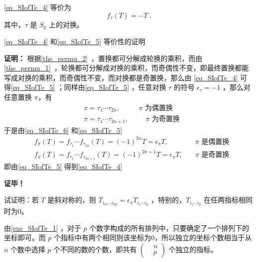 \autoref{eq_SIofTe_4} 等价为
\begin{equation}\label{eq_SIofTe_5}
f_\tau(T)=-T~.
\end{equation}
其中，$\tau$ 是 $S_p$ 上的对换。
\begin{example}{}
\autoref{eq_SIofTe_4} 和\autoref{eq_SIofTe_5} 等价性的证明

\textbf{证明：}
根据\autoref{the_permu_2}~，置换都可分解成轮换的乘积，而由\autoref{the_permu_1}~，轮换都可分解成对换的乘积，而奇偶性不变，即最终置换都能写成对换的乘积，而奇偶性不变，而对换都是奇置换，那么由 \autoref{eq_SIofTe_4} 可得\autoref{eq_SIofTe_5} ；同样由\autoref{eq_SIofTe_5} ，任意对换 $\tau$ 的符号 $\epsilon_\tau=-1$ ，那么对任意置换 $\pi$，有
\begin{equation}
\begin{aligned}
&\pi=\tau_1\cdots\tau_{2n}, \quad &\text{ $\pi$ 为偶置换}\\
&\pi=\tau_1\cdots\tau_{2n+1}, &\quad \text{ $\pi$ 为奇置换}
\end{aligned}
\end{equation}
于是由\autoref{eq_SIofTe_6} 和\autoref{eq_SIofTe_5} 
\begin{equation}
\begin{aligned}
&f_\pi(T)=f_{\tau_1}\cdots f_{\tau_{2n}}(T)=(-1)^{2n}T=\epsilon_\pi T,\quad&\text{$\pi$ 是偶置换}\\
&f_\pi(T)=f_{\tau_1}\cdots f_{\tau_{2n+1}}(T)=(-1)^{2n+1}T=\epsilon_\pi T,\quad&\text{$\pi$ 是奇置换}
\end{aligned}
\end{equation}
即由\autoref{eq_SIofTe_5} 得到\autoref{eq_SIofTe_4} 

\textbf{证毕！}

\end{example}






\begin{exercise}{}\label{exe_SIofTe_1}
试证明：若 $T$ 是斜对称的，则 $T_{i_{\pi1}\cdots i_{\pi p}}=\epsilon_\pi T_{i_1\cdots i_p}$ ，特别的，$ T_{i_1\cdots i_p}$ 在任两指标相同时为0。
\end{exercise}

由\autoref{exe_SIofTe_1} ，对于 $p$ 个数字构成的所有排列中，只要确定了一个排列下的坐标即可。而 $p$ 个指标中有两个相同则该坐标为0，所以独立的坐标个数相当于从 $n$ 个数中选择 $p$ 个不同的数的个数，即共有 $\left(\begin{aligned}
&n\\
&p
\end{aligned}\right)$
个独立的指标。

